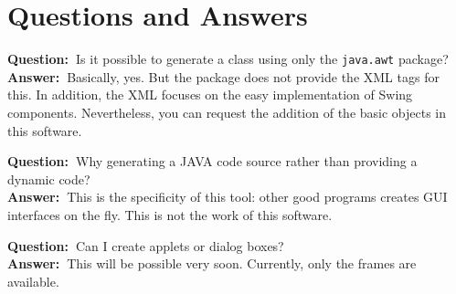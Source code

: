 \documentclass[a4paper,onecolumn,10pt]{book}
\newcommand{\jclass}[1]{\texttt{\small #1}}
\newcommand{\question}{\par\flushleft\textbf{Question:\ }}
\newcommand{\response}{\\\textbf{Answer:\ }}
\begin{document}
\section{Questions and Answers}
\question Is it possible to generate a class using only the
	\jclass{java.awt} package?
\response Basically, yes. But the package does not provide the
	XML tags for this. In addition, the XML focuses on the easy
	implementation of Swing components. Nevertheless, you can
	request the addition of the basic objects in this software.
	
\question Why generating a JAVA code source rather than providing
	a dynamic code?
\response This is the specificity of this tool: other good programs
	creates GUI interfaces on the fly. This is not the work of this
	software.
	
\question Can I create applets or dialog boxes?
\response This will be possible very soon. Currently, only the
	frames are available.
\end{document}
